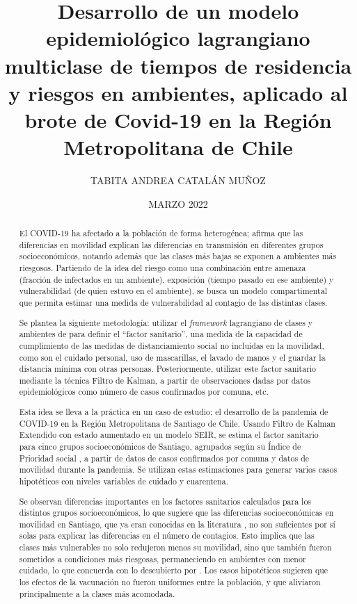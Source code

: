 \documentclass[upright, contnum]{umemoria}
\author{TABITA ANDREA CATALÁN MUÑOZ}
\title{Desarrollo de un modelo epidemiológico lagrangiano multiclase de tiempos de residencia y riesgos en ambientes, aplicado al brote de Covid-19 en la Región Metropolitana de Chile}
\date{MARZO 2022}
\begin{document}
\frontmatter
\maketitle

\begin{abstract}

El COVID-19 ha afectado a la población de forma heterogénea; \cite{Chang2021} afirma que las diferencias en movilidad explican las diferencias en transmisión en diferentes grupos socioeconómicos, notando además que las clases más bajas se exponen a ambientes más riesgosos. Partiendo de la idea del riesgo como una combinación entre amenaza (fracción de infectados en un ambiente), exposición (tiempo pasado en ese ambiente) y vulnerabilidad (de quien estuvo en el ambiente), se busca un modelo compartimental que permita estimar una medida de vulnerabilidad al contagio de las distintas clases.

Se plantea la siguiente metodología: utilizar el \textit{framework} lagrangiano de clases y ambientes de \cite{Bichara2018} para definir el ``factor sanitario'', una medida de la capacidad de cumplimiento de las medidas de distanciamiento social no incluídas en la movilidad, como son el cuidado personal, uso de mascarillas, el lavado de manos y el guardar la distancia mínima con otras personas. Posteriormente, utilizar este factor sanitario mediante la técnica Filtro de Kalman, a partir de observaciones dadas por datos epidemiológicos como número de casos confirmados por comuna, etc.

Esta idea se lleva a la práctica en un caso de estudio; el desarrollo de la pandemia de COVID-19 en la Región Metropolitana de Santiago de Chile. Usando Filtro de Kalman Extendido con estado aumentado en un modelo SEIR, se estima el factor sanitario para cinco grupos socioeconómicos de Santiago, agrupados según su Índice de Prioridad social \cite{SEREMIRM2019}, a partir de datos de casos confirmados por comuna y datos de movilidad durante la pandemia. Se utilizan estas estimaciones para generar varios casos hipotéticos con niveles variables de cuidado y cuarentena.

Se observan diferencias importantes en los factores sanitarios calculados para los distintos grupos socioeconómicos, lo que sugiere que las diferencias socioeconómicas en movilidad en Santiago, que ya eran conocidas en la literatura \cite{Gozzi2021}, no son suficientes por sí solas para explicar las diferencias en el número de contagios. Esto implica que las clases más vulnerables no solo redujeron menos su movilidad, sino que también fueron sometidos a condiciones más riesgosas, permaneciendo en ambientes con menor cuidado, lo que concuerda con lo descubierto por \cite{Chang2021}. Los casos hipotéticos sugieren que los efectos de la vacunación no fueron uniformes entre la población, y que aliviaron principalmente a la clases más acomodada.


\end{abstract}
\end{document}
